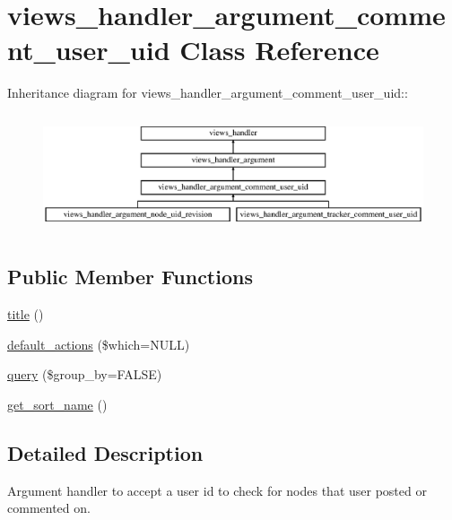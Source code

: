 \hypertarget{classviews__handler__argument__comment__user__uid}{
\section{views\_\-handler\_\-argument\_\-comment\_\-user\_\-uid Class Reference}
\label{classviews__handler__argument__comment__user__uid}
}
Inheritance diagram for views\_\-handler\_\-argument\_\-comment\_\-user\_\-uid::\begin{figure}[H]
\begin{center}
\leavevmode
\includegraphics[height=3.5cm]{classviews__handler__argument__comment__user__uid}
\end{center}
\end{figure}
\subsection*{Public Member Functions}
\begin{DoxyCompactItemize}
\item 
\hyperlink{classviews__handler__argument__comment__user__uid_a4e106a92bbbdb88e1207fe525480c18b}{title} ()
\item 
\hyperlink{classviews__handler__argument__comment__user__uid_a492e0d7daafffc95f6ac936111556559}{default\_\-actions} (\$which=NULL)
\item 
\hyperlink{classviews__handler__argument__comment__user__uid_a6c3118256c6d2c60167d289c947d31c6}{query} (\$group\_\-by=FALSE)
\item 
\hyperlink{classviews__handler__argument__comment__user__uid_a8f744e47fec12bc54c231f8a41a3447d}{get\_\-sort\_\-name} ()
\end{DoxyCompactItemize}


\subsection{Detailed Description}
Argument handler to accept a user id to check for nodes that user posted or commented on. 

